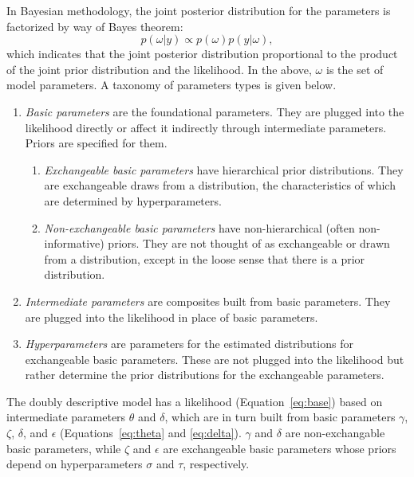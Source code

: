 \documentclass[12pt, letterpaper]{article}
\begin{document}
In Bayesian methodology, the joint posterior distribution for the parameters is factorized by way of Bayes theorem:
\begin{equation} \label{eq:bayes}
	p(\omega | y) \propto
	p(\omega)
	p(y | \omega)
,\end{equation}
which indicates that the joint posterior distribution proportional to the product of the joint prior distribution and the likelihood. In the above, $\omega$ is the set of model parameters. A taxonomy of parameters types is given below.
\begin{enumerate}
	\item \emph{Basic parameters}
	are the foundational parameters. They are plugged into the likelihood directly or affect it indirectly through intermediate parameters. Priors are specified for them.
	\begin{enumerate}
		\item \emph{Exchangeable basic parameters} 
		have hierarchical prior distributions. They are exchangeable draws from a distribution, the characteristics of which are determined by hyperparameters.
		\item \emph{Non-exchangeable basic parameters}
		have non-hierarchical (often non-informative) priors. They are not thought of as exchangeable or drawn from a distribution, except in the loose sense that there is a prior distribution.
	\end{enumerate}
	\item \emph{Intermediate parameters}
	are composites built from basic parameters. They are plugged into the likelihood in place of basic parameters.
	\item \emph{Hyperparameters}
	are parameters for the estimated distributions for exchangeable basic parameters. These are not plugged into the likelihood but rather determine the prior distributions for the exchangeable parameters.
\end{enumerate}
The doubly descriptive model has a likelihood (Equation~\ref{eq:base}) based on intermediate parameters $\theta$ and $\delta$, which are in turn built from basic parameters $\gamma$, $\zeta$, $\delta$, and $\epsilon$ (Equations~\ref{eq:theta} and \ref{eq:delta}). $\gamma$ and $\delta$ are non-exchangable basic parameters, while $\zeta$ and $\epsilon$ are exchangeable basic parameters whose priors depend on hyperparameters $\sigma$ and $\tau$, respectively.
\end{document}
